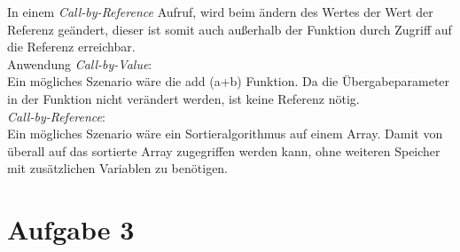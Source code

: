 \documentclass[12pt]{article}
\begin{document}
\begin{enumerate}[a)]
In einem \emph{Call-by-Reference} Aufruf, wird beim \"andern des Wertes der Wert der Referenz ge\"andert, dieser ist somit auch au{\ss}erhalb der Funktion durch Zugriff auf die Referenz erreichbar.\\
Anwendung \emph{Call-by-Value}:\\
Ein mögliches Szenario wäre die add (a+b) Funktion. Da die Übergabeparameter in der Funktion nicht verändert werden, ist keine Referenz nötig.\\
\emph{Call-by-Reference}:\\
Ein mögliches Szenario wäre ein Sortieralgorithmus auf einem Array. Damit von überall auf das sortierte Array zugegriffen werden kann, ohne weiteren Speicher mit zusätzlichen Variablen zu benötigen.
\end{enumerate}
\section*{Aufgabe 3}
\end{document}

